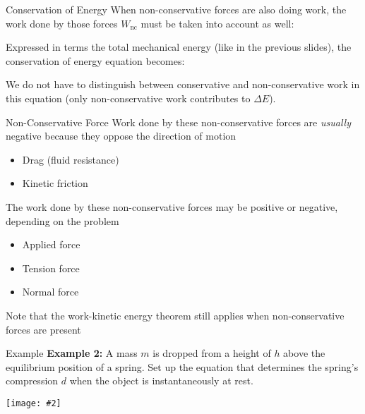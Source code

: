 \documentclass[12pt,compress,aspectratio=169]{beamer}
\newcommand{\pic}[2]{\texttt{[image: \#2]}}
\newcommand{\eq}[2]{\vspace{#1}{\Large\begin{displaymath}#2\end{displaymath}}}
\begin{document}
\begin{frame}{Conservation of Energy}
  When non-conservative forces are also doing work, the work done by those
  forces $W_{\textrm{nc}}$ must be taken into account as well:
    
  \eq{-.2in}{
    \boxed{\sum K_i +\sum U_i +\sum W_{\textrm{nc}}=\sum K_i'+\sum U_i'}
  }

  Expressed in terms the total mechanical energy (like in the previous slides),
  the conservation of energy equation becomes:
  
  \eq{-.2in}{
    \boxed{\Delta E=\sum\Delta K_i + \sum\Delta U_i =W_\mathrm{net}}
  }

  We do not have to distinguish between conservative and non-conservative work
  in this equation (only non-conservative work contributes to $\Delta E$).
\end{frame}



\begin{frame}{Non-Conservative Force}
  Work done by these non-conservative forces are \emph{usually} negative
  because they oppose the direction of motion
  \begin{itemize}
  \item Drag (fluid resistance)
  \item Kinetic friction
  \end{itemize}
  The work done by these non-conservative forces may be positive or negative,
  depending on the problem
  \begin{itemize}
  \item Applied force
  \item Tension force
  \item Normal force
  \end{itemize}
  Note that the work-kinetic energy theorem still applies when non-conservative
  forces are present
\end{frame}


\begin{frame}{Example}
  \textbf{Example 2:} A mass $m$ is dropped from a height of $h$ above the
  equilibrium position of a spring. Set up the equation that determines the
  spring's compression $d$ when the object is instantaneously at rest.
  \begin{center}
    \pic{.35}{spring-example1.png}
  \end{center}
\end{frame}
\end{document}
